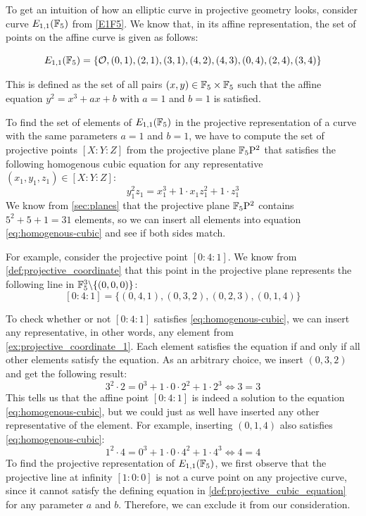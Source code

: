 \begin{example}
\label{ex:E1F5-projective}
 To get an intuition of how an elliptic curve in projective geometry looks, consider curve $E_{1,1}(\mathbb{F}_5)$ from \examplename{} \ref{E1F5}. We know that, in its affine representation, the set of points on the affine  curve is given as follows:

\begin{equation}\label{eq:E1F5-affine}
E_{1,1}(\mathbb{F}_5) = \{\mathcal{O}, (0,1),(2,1),(3,1),(4,2),(4,3),(0,4),(2,4),(3,4)\}
\end{equation}

This is defined as the set of all pairs $(x,y)\in \mathbb{F}_5\times \mathbb{F}_5$ such that the affine  equation $y^2 = x^3 + ax +b$ with $a=1$ and $b=1$ is satisfied.

To find the set of elements of $E_{1,1}(\mathbb{F}_5)$ in the projective representation of a  curve with the same parameters $a=1$ and $b=1$, we have to compute the set of projective points $[X:Y:Z]$ from the projective plane $\mathbb{F}_5\mathrm{P}^2$ that satisfies the following homogenous cubic equation for any representative $(x_1,y_1,z_1)\in [X:Y:Z]$:
\begin{equation}\label{eq:homogenous-cubic}
y_1^2z_1 = x_1^3 + 1\cdot x_1 z_1^2 + 1\cdot z_1^3
\end{equation}
We know from \secname{} \ref{sec:planes} that the projective plane $\mathbb{F}_5\mathrm{P}^2$ contains $5^2+5+1= 31$ elements, so we can insert all elements into equation \eqref{eq:homogenous-cubic} and see if both sides match.

For example, consider the projective point $[0:4:1]$. We know from \eqref{def:projective_coordinate} that this point in the projective plane represents the following line in $\mathbb{F}_5^3\backslash\{(0,0,0)\}$:
\begin{equation}
\label{ex:projective_coordinate_1}
[0:4:1] = \{(0,4,1),(0,3,2),(0,2,3),(0,1,4)\}
\end{equation} 

To check whether or not $[0:4:1]$ satisfies \eqref{eq:homogenous-cubic}, we can insert any representative, in other words, any element from  \eqref{ex:projective_coordinate_1}. Each element satisfies the equation if and only if all other elements satisfy the equation. As an arbitrary choice, we insert $(0,3,2)$ and get the following result:
$$
3^2\cdot 2 = 0^3 + 1\cdot 0\cdot 2^2 + 1\cdot 2^3 \Leftrightarrow
3 = 3
$$
This tells us that the affine point $[0:4:1]$ is indeed a solution to the equation \eqref{eq:homogenous-cubic}, but we could just as well have inserted any other representative of the element. For example, inserting $(0,1,4)$ also satisfies \eqref{eq:homogenous-cubic}: 
$$
1^2\cdot 4 = 0^3 + 1\cdot 0\cdot 4^2 + 1\cdot 4^3 \Leftrightarrow
4=4
$$
To find the projective representation of $E_{1,1}(\mathbb{F}_5)$, we first observe that the projective line at infinity $[1:0:0]$ is not a curve point on any projective  curve, since it cannot satisfy the defining equation in \eqref{def:projective_cubic_equation} for any parameter $a$ and $b$. Therefore, we can exclude it from our consideration. 


\end{example}
